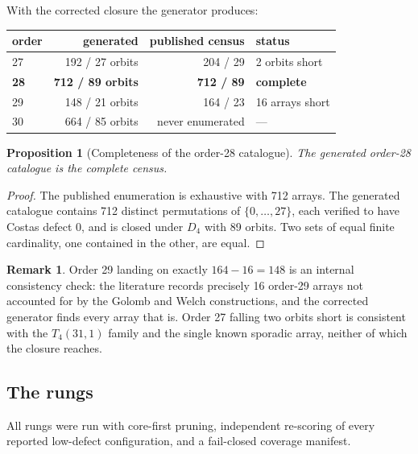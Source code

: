 \documentclass[11pt,a4paper]{article}
\newtheorem{proposition}[theorem]{Proposition}
\theoremstyle{definition}
\newtheorem{remark}[theorem]{Remark}
\begin{document}
With the corrected closure the generator produces:

\begin{center}
\begin{tabular}{@{}lrrl@{}}
\toprule
order & generated & published census & status \\
\midrule
27 & 192 / 27 orbits & 204 / 29 & 2 orbits short \\
\textbf{28} & \textbf{712 / 89 orbits} & \textbf{712 / 89} & \textbf{complete} \\
29 & 148 / 21 orbits & 164 / 23 & 16 arrays short \\
30 & 664 / 85 orbits & never enumerated & --- \\
\bottomrule
\end{tabular}
\end{center}

\begin{proposition}[Completeness of the order-28 catalogue]
The generated order-28 catalogue is the complete census.
\end{proposition}
\begin{proof}
The published enumeration is exhaustive with 712 arrays. The generated
catalogue contains 712 distinct permutations of $\{0,\dots,27\}$, each verified
to have Costas defect 0, and is closed under $D_4$ with 89 orbits. Two sets of
equal finite cardinality, one contained in the other, are equal.
\end{proof}

\begin{remark}
Order 29 landing on exactly $164-16=148$ is an internal consistency check: the
literature records precisely 16 order-29 arrays not accounted for by the
Golomb and Welch constructions, and the corrected generator finds every array
that is. Order 27 falling two orbits short is consistent with the $T_4(31,1)$
family and the single known sporadic array, neither of which the closure
reaches.
\end{remark}

\subsection{The rungs}
\label{sec:rungs}

All rungs were run with core-first pruning, independent re-scoring of every
reported low-defect configuration, and a fail-closed coverage manifest.
\end{document}
